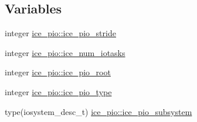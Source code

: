\subsection*{Variables}
\begin{DoxyCompactItemize}
\item 
integer \hyperlink{namespaceice__pio_a5de9334d10947cea25743c63ea790857}{ice\_\-pio::ice\_\-pio\_\-stride}
\item 
integer \hyperlink{namespaceice__pio_a727ea1a597ce3ed71fc1e986d39e263c}{ice\_\-pio::ice\_\-num\_\-iotasks}
\item 
integer \hyperlink{namespaceice__pio_a005816f4168d35918e2c74a88989e871}{ice\_\-pio::ice\_\-pio\_\-root}
\item 
integer \hyperlink{namespaceice__pio_a29c1f71d91a554fa266112edb114b555}{ice\_\-pio::ice\_\-pio\_\-type}
\item 
type(iosystem\_\-desc\_\-t) \hyperlink{namespaceice__pio_ad7b25bee3af2d23622eded54fa930040}{ice\_\-pio::ice\_\-pio\_\-subsystem}
\end{DoxyCompactItemize}
